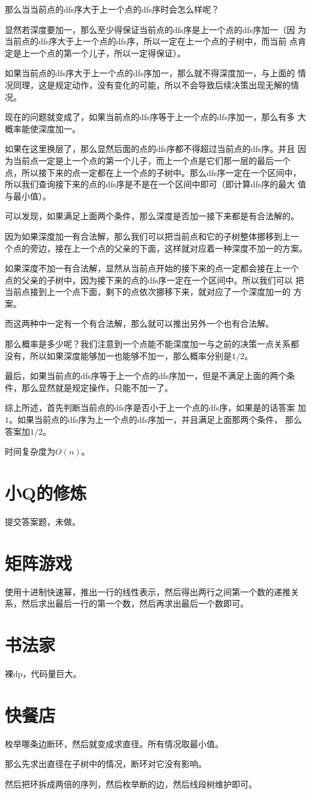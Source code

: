 \documentclass[a4paper]{article}
\begin{document}
那么当当前点的dfs序大于上一个点的dfs序时会怎么样呢？

显然若深度要加一，那么至少得保证当前点的dfs序是上一个点的dfs序加一（因
为当前点的dfs序大于上一个点的dfs序，所以一定在上一个点的子树中，而当前
点肯定是上一个点的第一个儿子，所以一定得保证）。

如果当前点的dfs序大于上一个点的dfs序加一，那么就不得深度加一，与上面的
情况同理，这是规定动作，没有变化的可能，所以不会导致后续决策出现无解的情况。

现在的问题就变成了，如果当前点的dfs序等于上一个点的dfs序加一，那么有多
大概率能使深度加一。

如果在这里换层了，那么显然后面的点的dfs序都不得超过当前点的dfs序。并且
因为当前点一定是上一个点的第一个儿子，而上一个点是它们那一层的最后一个
点，所以接下来的点一定都在上一个点的子树中。那么dfs序一定在一个区间中，
所以我们查询接下来的点的dfs序是不是在一个区间中即可（即计算dfs序的最大
值与最小值）。

可以发现，如果满足上面两个条件，那么深度是否加一接下来都是有合法解的。

因为如果深度加一有合法解，那么我们可以把当前点和它的子树整体挪移到上一
个点的旁边，接在上一个点的父亲的下面，这样就对应着一种深度不加一的方案。

如果深度不加一有合法解，显然从当前点开始的接下来的点一定都会接在上一个
点的父亲的子树中，因为接下来的点的dfs序一定在一个区间中。所以我们可以
把当前点接到上一个点下面，剩下的点依次挪移下来，就对应了一个深度加一的
方案。

而这两种中一定有一个有合法解，那么就可以推出另外一个也有合法解。

那么概率是多少呢？我们注意到一个点能不能深度加一与之前的决策一点关系都
没有，所以如果深度能够加一也能够不加一，那么概率分别是$1/2$。

最后，如果当前点的dfs序等于上一个点的dfs序加一，但是不满足上面的两个条
件，那么显然就是规定操作，只能不加一了。

综上所述，首先判断当前点的dfs序是否小于上一个点的dfs序，如果是的话答案
加$1$。如果当前点的dfs序为上一个点的dfs序加一，并且满足上面那两个条件，
那么答案加$1/2$。

时间复杂度为$O(n)$。

\section{小Q的修炼}

提交答案题，未做。

\section{矩阵游戏}

使用十进制快速幂，推出一行的线性表示，然后得出两行之间第一个数的递推关
系，然后求出最后一行的第一个数，然后再求出最后一个数即可。

\section{书法家}

裸dp，代码量巨大。

\section{快餐店}

枚举哪条边断环，然后就变成求直径。所有情况取最小值。

那么先求出直径在子树中的情况，断环对它没有影响。

然后把环拆成两倍的序列，然后枚举断的边，然后线段树维护即可。
\end{document}
